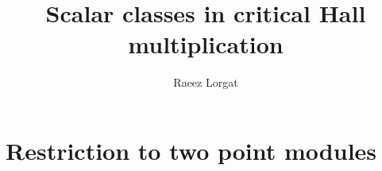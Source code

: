 \documentclass[11pt,oneside]{memoir}
\title{Scalar classes in critical Hall multiplication}
\author{Raeez Lorgat}
\date{}
\begin{document}
\mainmatter




\chapter{Restriction to two point modules}



\end{document}
